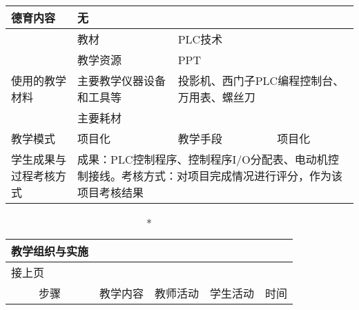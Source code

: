 {\begin{longtable}{|m{20mm}|m{20mm}|m{20mm}|m{20mm}|m{20mm}|m{28mm}|}
\hline
\centering 德育内容 &\multicolumn{5}{m{108mm}|}{无}\\
\hline
 &教材 & \multicolumn{4}{l|}{PLC技术}\\
\cline{2-6}& 教学资源 &\multicolumn{4}{m{88mm}|}{PPT}\\
\cline{2-6}\centering 使用的教学材料& 主要教学仪器设备和工具等 &\multicolumn{4}{m{88mm}|}{投影机、西门子PLC编程控制台、万用表、螺丝刀}\\
\cline{2-6}& 主要耗材 &\multicolumn{4}{m{88mm}|}{\qquad}\\
\hline
\centering 教学模式 &\multicolumn{2}{l|}{项目化}&\centering 教学手段 &\multicolumn{2}{l|}{项目化}\\
\hline
\centering 学生成果与过程考核方式 &\multicolumn{5}{m{108mm}|}{成果：PLC控制程序、控制程序I/O分配表、电动机控制接线。考核方式：对项目完成情况进行评分，作为该项目考核结果}
\end{longtable}
\clearpage


\begin{landscape}
\begin{longtable}{|m{10mm}|m{50mm}|m{50mm}|m{50mm}|m{15mm}|}
\caption*{\huge 教学组织与实施}\\
\hline
\endfirsthead
\multicolumn{5}{l}{\small 接上页}\\
\hline
\multicolumn{1}{|c|}{步骤}&\multicolumn{1}{c|}{教学内容}&\multicolumn{1}{c|}{教师活动}&\multicolumn{1}{c|}{学生活动}&\multicolumn{1}{c|}{时间}\\
\hline
\endhead


\end{longtable}
\end{landscape}}
